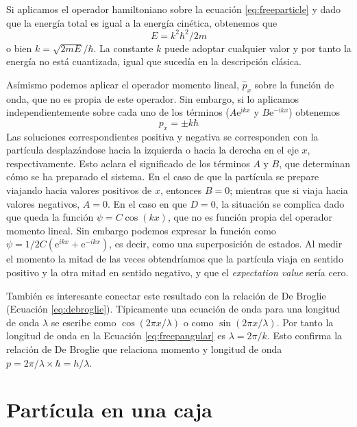 Si aplicamos el operador hamiltoniano sobre la ecuación 
\ref{eq:freeparticle} y dado que la energía total es igual
a la energía cinética, obtenemos que 
\begin{equation}
E=k^2\hbar^2/2m
\end{equation}
o bien $k=\sqrt{2mE}/\hbar$. La constante $k$ puede adoptar
cualquier valor y por tanto la energía no está cuantizada,
igual que sucedía en la descripción clásica. 

Asímismo podemos aplicar el operador momento lineal, 
$\hat{p}_x$ sobre la función de onda, que no es propia
de este operador. Sin embargo, si lo aplicamos 
independientemente sobre cada uno de los términos
($A\mathrm{e}^{\mathrm{i}kx}$ y $B\mathrm{e}^{-\mathrm{i}kx}$)
obtenemos
\begin{equation}
    p_x = \pm k\hbar
\end{equation}
Las soluciones correspondientes positiva y negativa 
se corresponden con la partícula desplazándose
hacia la izquierda o hacia la derecha en el eje $x$, 
respectivamente. Esto aclara el significado de los 
términos $A$ y $B$, que determinan cómo se ha preparado 
el sistema. En el caso de que la partícula se prepare 
viajando hacia valores positivos de $x$, entonces $B=0$; 
mientras que si viaja hacia valores negativos, $A=0$. 
En el caso en que
$D=0$, la situación se complica dado que queda la función
$\psi=C\cos(kx)$, que no es función propia del operador
momento lineal. Sin embargo podemos expresar la función como
$\psi=1/2C(\mathrm{e}^{ikx}+\mathrm{e}^{-ikx})$,
es decir, como una superposición de estados. Al medir el
momento la mitad de las veces obtendríamos que la partícula
viaja en sentido positivo y la otra mitad en sentido
negativo, y que el \textit{expectation value} sería cero.

También es interesante conectar este resultado 
con la relación de De Broglie (Ecuación
\ref{eq:debroglie}). Típicamente una ecuación de
onda para una longitud de onda $\lambda$ se
escribe como $\cos(2\pi x/\lambda)$ o como
$\sin(2\pi x/\lambda)$. Por tanto la longitud de
onda en la Ecuación \ref{eq:freepangular} es
$\lambda=2\pi/k$. Esto confirma la relación de 
De Broglie que relaciona momento y longitud de
onda $p=2\pi/\lambda\times\hbar=h/\lambda$.

\section{Partícula en una caja}
